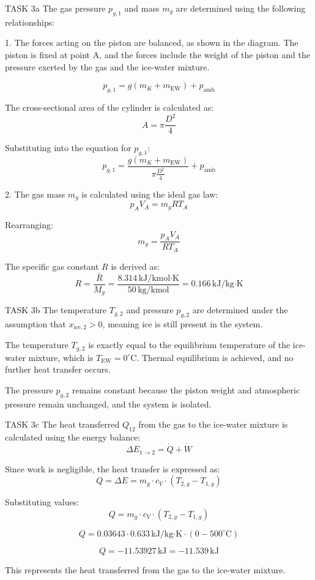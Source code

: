 TASK 3a  
The gas pressure \( p_{g,1} \) and mass \( m_g \) are determined using the following relationships:  

1. The forces acting on the piston are balanced, as shown in the diagram. The piston is fixed at point A, and the forces include the weight of the piston and the pressure exerted by the gas and the ice-water mixture.  

\[
p_{g,1} = g \left( m_K + m_{\text{EW}} \right) + p_{\text{amb}}
\]

The cross-sectional area of the cylinder is calculated as:  
\[
A = \pi \frac{D^2}{4}
\]

Substituting into the equation for \( p_{g,1} \):  
\[
p_{g,1} = \frac{g \left( m_K + m_{\text{EW}} \right)}{\pi \frac{D^2}{4}} + p_{\text{amb}}
\]

2. The gas mass \( m_g \) is calculated using the ideal gas law:  
\[
p_A V_A = m_g R T_A
\]

Rearranging:  
\[
m_g = \frac{p_A V_A}{R T_A}
\]

The specific gas constant \( R \) is derived as:  
\[
R = \frac{\bar{R}}{M_g} = \frac{8.314 \, \text{kJ/kmol·K}}{50 \, \text{kg/kmol}} = 0.166 \, \text{kJ/kg·K}
\]

TASK 3b  
The temperature \( T_{g,2} \) and pressure \( p_{g,2} \) are determined under the assumption that \( x_{\text{ice},2} > 0 \), meaning ice is still present in the system.  

The temperature \( T_{g,2} \) is exactly equal to the equilibrium temperature of the ice-water mixture, which is \( T_{\text{EW}} = 0^\circ\text{C} \). Thermal equilibrium is achieved, and no further heat transfer occurs.  

The pressure \( p_{g,2} \) remains constant because the piston weight and atmospheric pressure remain unchanged, and the system is isolated.  

TASK 3c  
The heat transferred \( Q_{12} \) from the gas to the ice-water mixture is calculated using the energy balance:  
\[
\Delta E_{1 \to 2} = \dot{Q} + \dot{W}
\]

Since work is negligible, the heat transfer is expressed as:  
\[
Q = \Delta E = m_g \cdot c_V \cdot (T_{2,g} - T_{1,g})
\]

Substituting values:  
\[
Q = m_g \cdot c_V \cdot (T_{2,g} - T_{1,g})
\]

\[
Q = 0.03643 \cdot 0.633 \, \text{kJ/kg·K} \cdot (0 - 500^\circ\text{C})
\]

\[
Q = -11.53927 \, \text{kJ} = -11.539 \, \text{kJ}
\]  

This represents the heat transferred from the gas to the ice-water mixture.